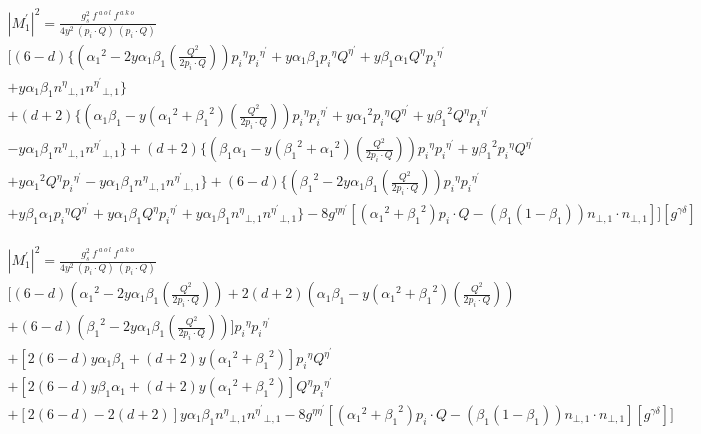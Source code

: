 \begin{equation}
\begin{split}
{|{M}^{\prime}_1|}^2 =\frac{g_s^2 \:f^{\:a\:o\:l}\: f^{\:a\:k\:o}}{4y^2\:(p_i\cdot Q) \:(p_i\cdot Q)} \\
[(6-d)\lbrace({\alpha_1}^2 -2y\alpha_1 \beta_1(\frac{Q^2}{2p_i \cdot Q})) {p_i}^{\eta}{p_i}^{{\eta}^{\prime}}+y\alpha_1\beta_1 {p_i}^{\eta}{Q}^{{\eta}^{\prime}}
+y\beta_1\alpha_1  {Q}^{\eta}{p_i}^{{\eta}^{\prime}}\\+y\alpha_1\beta_1{n^{{\eta}}}_{\bot,1}{n^{{\eta}^{\prime}}}_{\bot,1}\rbrace\\
+(d+2)\lbrace(\alpha_1\beta_1-y({\alpha_1}^2+{\beta_1}^2) (\frac{Q^2}{2p_i \cdot Q})) {p_i}^{\eta}{p_i}^{{\eta}^{\prime}}+y{\alpha_1}^2{p_i}^{\eta}{Q}^{{\eta}^{\prime}}+y{\beta_1}^2 {Q}^{\eta}{p_i}^{{\eta}^{\prime}}\\-y\alpha_1\beta_1{n^{{\eta}}}_{\bot,1}{n^{{\eta}^{\prime}}}_{\bot,1}\rbrace+(d+2)\lbrace(\beta_1\alpha_1-y({\beta_1}^2+{\alpha_1}^2)(\frac{Q^2}{2p_i \cdot Q})) {p_i}^{\eta}{p_i}^{{\eta}^{\prime}}+y{\beta_1}^2{p_i}^{\eta}{Q}^{{\eta}^{\prime}}\\
+y{\alpha_1}^2 {Q}^{\eta}{p_i}^{{\eta}^{\prime}}-y\alpha_1\beta_1{n^{{\eta}}}_{\bot,1}{n^{{\eta}^{\prime}}}_{\bot,1}\rbrace
+(6-d)\lbrace({\beta_1}^2 -2y\alpha_1\beta_1 (\frac{Q^2}{2p_i \cdot Q})) {p_i}^{\eta}{p_i}^{{\eta}^{\prime}}\\+y\beta_1\alpha_1 {p_i}^{\eta}{Q}^{{\eta}^{\prime}}
+y\alpha_1\beta_1 {Q}^{\eta}{p_i}^{{\eta}^{\prime}}+y\alpha_1\beta_1{n^{{\eta}}}_{\bot,1}{n^{{\eta}^{\prime}}}_{\bot,1}\rbrace-8g^{{\eta}{{\eta}^{\prime}}}[({\alpha_1}^2+{\beta_1}^2) p_i \cdot Q - ({\beta_1}(1-\beta_1)){n}_{\bot,1}\cdot{n}_{\bot,1}]][g^{{\gamma}{{\delta}}}]
\end{split}
\end{equation}


\begin{equation}
\begin{split}
{|{M}^{\prime}_1|}^2 =\frac{g_s^2 \:f^{\:a\:o\:l}\: f^{\:a\:k\:o}}{4y^2\:(p_i\cdot Q) \:(p_i\cdot Q)} \\
[(6-d)({\alpha_1}^2 -2y\alpha_1 \beta_1(\frac{Q^2}{2p_i \cdot Q}))+2(d+2)({\alpha_1}{\beta}_1 -y({\alpha_1}^2 +{\beta_1}^2)(\frac{Q^2}{2p_i \cdot Q}))\\+(6-d)({\beta_1}^2 -2y\alpha_1 \beta_1(\frac{Q^2}{2p_i \cdot Q})) ]{p_i}^{\eta}{p_i}^{{\eta}^{\prime}}\\
+[2(6-d)y\alpha_1\beta_1+(d+2)y({\alpha_1}^2 +{\beta_1}^2)] {p_i}^{\eta}{Q}^{{\eta}^{\prime}}\\
+[2(6-d)y\beta_1\alpha_1+(d+2)y({\alpha_1}^2 +{\beta_1}^2)]  {Q}^{\eta}{p_i}^{{\eta}^{\prime}}\\+[2(6-d)-2(d+2)]y\alpha_1\beta_1{n^{{\eta}}}_{\bot,1}{n^{{\eta}^{\prime}}}_{\bot,1}-8g^{{\eta}{{\eta}^{\prime}}}[({\alpha_1}^2+{\beta_1}^2) p_i \cdot Q - ({\beta_1}(1-\beta_1)){n}_{\bot,1}\cdot{n}_{\bot,1}][g^{{\gamma}{{\delta}}}]]
\end{split}
\end{equation}

